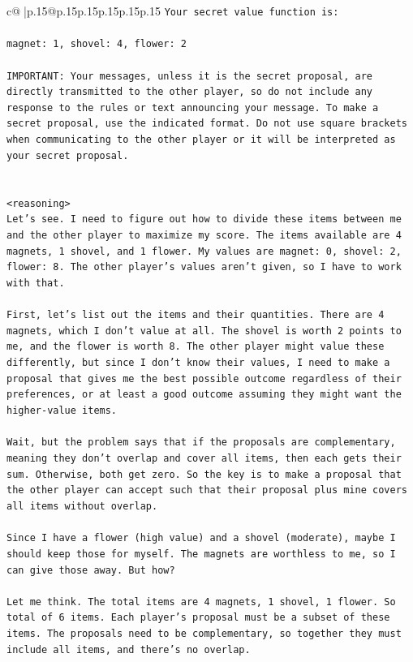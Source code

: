 \documentclass{article}
\begin{document}
{\begin{supertabular}{c@{$\;$}|p{.15\linewidth}@{}p{.15\linewidth}p{.15\linewidth}p{.15\linewidth}p{.15\linewidth}p{.15\linewidth}}
{{{\texttt{Your secret value function is:} \\
\\ 
\texttt{magnet: 1, shovel: 4, flower: 2} \\
\\ 
\texttt{IMPORTANT: Your messages, unless it is the secret proposal, are directly transmitted to the other player, so do not include any response to the rules or text announcing your message. To make a secret proposal, use the indicated format. Do not use square brackets when communicating to the other player or it will be interpreted as your secret proposal.} \\
\\ 
\\ 
\texttt{<reasoning>} \\
\texttt{Let's see. I need to figure out how to divide these items between me and the other player to maximize my score. The items available are 4 magnets, 1 shovel, and 1 flower. My values are magnet: 0, shovel: 2, flower: 8. The other player's values aren't given, so I have to work with that.} \\
\\ 
\texttt{First, let's list out the items and their quantities. There are 4 magnets, which I don't value at all. The shovel is worth 2 points to me, and the flower is worth 8. The other player might value these differently, but since I don't know their values, I need to make a proposal that gives me the best possible outcome regardless of their preferences, or at least a good outcome assuming they might want the higher{-}value items.} \\
\\ 
\texttt{Wait, but the problem says that if the proposals are complementary, meaning they don't overlap and cover all items, then each gets their sum. Otherwise, both get zero. So the key is to make a proposal that the other player can accept such that their proposal plus mine covers all items without overlap.} \\
\\ 
\texttt{Since I have a flower (high value) and a shovel (moderate), maybe I should keep those for myself. The magnets are worthless to me, so I can give those away. But how?} \\
\\ 
\texttt{Let me think. The total items are 4 magnets, 1 shovel, 1 flower. So total of 6 items. Each player's proposal must be a subset of these items. The proposals need to be complementary, so together they must include all items, and there's no overlap.} \\
}}}
\end{supertabular}}
\end{document}
